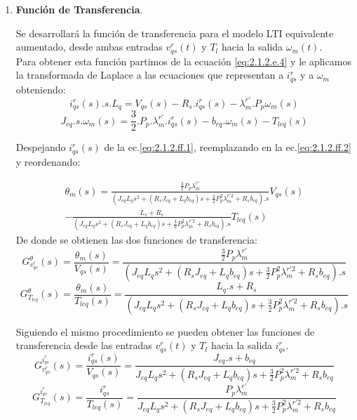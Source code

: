 \documentclass[10pt]{article}
\begin{document}
\begin{enumerate}
	\item \textbf{Función de Transferencia}.
	
	Se desarrollará la función de transferencia para el modelo LTI equivalente aumentado, desde ambas entradas $v^{r}_{qs}(t)$ y $T_{l}$ hacia la salida $\omega_{m}(t)$.\\
	Para obtener esta función partimos de la ecuación \ref{eq:2.1.2.e.4} y le aplicamos la transformada de Laplace a las ecuaciones que representan a $i^{r}_{qs}$ y a $\omega_{m}$ obteniendo:
	\begin{equation}
	i^{r}_{qs}(s).s.L_{q}=V_{qs}(s)-R_{s}.i^{r}_{qs}(s)-\lambda^{r'}_{m}.P_{p}\omega_{m}(s)
	\label{eq:2.1.2.ff.1}
	\end{equation}
	\begin{equation}
	J_{eq}.s.\omega_{m}(s)=\frac{3}{2}.P_{p}.\lambda^{r'}_{m}.i^{r}_{qs}(s)-b_{eq}.\omega_{m}(s)-T_{leq}(s)
	\label{eq:2.1.2.ff.2}
	\end{equation}
	
Despejando $i^{r}_{qs}(s)$ de la ec.\ref{eq:2.1.2.ff.1}, reemplazando en la ec.\ref{eq:2.1.2.ff.2} y reordenando:

\begin{eqnarray}
	\theta_{m}(s)=\frac{\frac{3}{2}P_{p}\lambda^{r'}_{m}}{(J_{eq}L_{q}s^{2}+(R_{s}J_{eq}+L_{q}b_{eq})s + \frac{3}{2}P_{p}^{2}\lambda ^{r'2}_{m}+R_{s}b_{eq}).s} V_{qs}(s) \nonumber\\
	- \frac{L_{s}+R_{s}}{(J_{eq}L_{q}s^{2}+(R_{s}J_{eq}+L_{q}b_{eq})s + \frac{3}{2}P_{p}^{2}\lambda ^{r'2}_{m}+R_{s}b_{eq}).s} T_{leq}(s)
	\label{eq:2.1.2.ff.3}
	\end{eqnarray}
De donde se obtienen las dos funciones de transferencia:
\begin{equation}
	G^{\theta}_{v^{r}_{qs}}(s)=\frac{\theta_{m}(s)}{V_{qs}(s)}=\frac{\frac{3}{2}P_{p}\lambda^{r'}_{m}}{(J_{eq}L_{q}s^{2}+(R_{s}J_{eq}+L_{q}b_{eq})s + \frac{3}{2}P_{p}^{2}\lambda ^{r'2}_{m}+R_{s}b_{eq}).s}
	\label{eq:2.1.2.ff.4}
	\end{equation}
	\begin{equation}
	G^{\theta}_{T_{leq}}(s)=\frac{\theta_{m}(s)}{T_{leq}(s)}=\frac{L_{q}.s+R_{s}}{(J_{eq}L_{q}s^{2}+(R_{s}J_{eq}+L_{q}b_{eq})s + \frac{3}{2}P_{p}^{2}\lambda ^{r'2}_{m}+R_{s}b_{eq}).s}
	\label{eq:2.1.2.ff.5}
	\end{equation} 


Siguiendo el mismo procedimiento se pueden obtener las funciones de transferencia desde las entradas $v^{r}_{qs}(t)$ y $T_{l}$ hacia la salida $i^{r}_{qs}$.\\
\begin{equation}
	G^{i^{r}_{qs}}_{v^{r}_{qs}}(s)=\frac{i^{r}_{qs}(s)}{V_{qs}(s)}=\frac{J_{eq}.s+b_{eq}}{J_{eq}L_{q}s^{2}+(R_{s}J_{eq}+L_{q}b_{eq})s + \frac{3}{2}P_{p}^{2}\lambda ^{r'2}_{m}+R_{s}b_{eq}}
	\label{eq:2.1.2.ff.6}
	\end{equation}
	\begin{equation}
	G^{i^{r}_{qs}}_{T_{leq}}(s)=\frac{i^{r}_{qs}}{T_{leq}(s)}=\frac{P_{p}\lambda^{r'}_{m}}{J_{eq}L_{q}s^{2}+(R_{s}J_{eq}+L_{q}b_{eq})s + \frac{3}{2}P_{p}^{2}\lambda ^{r'2}_{m}+R_{s}b_{eq}}
	\label{eq:2.1.2.ff.7}
	\end{equation} 
\end{enumerate}
\end{document}
